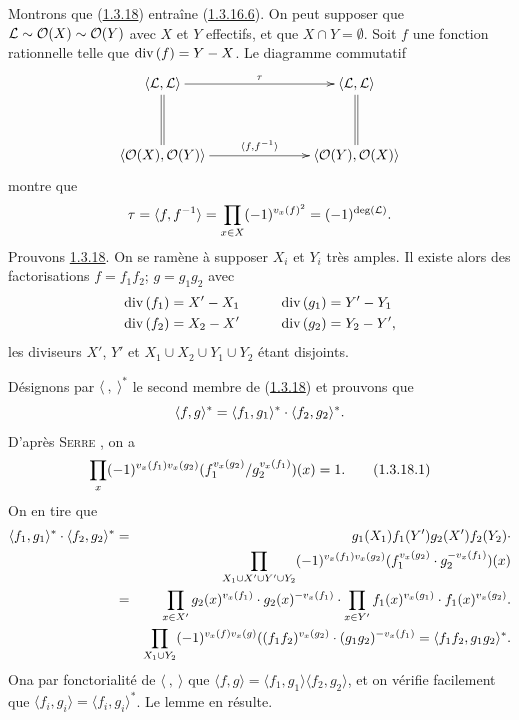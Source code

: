 \documentclass[10pt]{../fichiers-configuration-latex/smfart}
\begin{document}
Montrons que (\hyperref[XVIII.lem1.3.18]{1.3.18}) entraîne
(\hyperref[XVIII.par1.3.16.6]{1.3.16.6}). On peut supposer que 
${\mathcal L}\sim {\mathcal O}(X)\sim {\mathcal O}(Y)$ avec $X$ et $Y$ effectifs, et
que $X\cap Y=∅$. Soit $f$ une fonction rationnelle telle que
$\text{\rm div\,}(f)=Y-X$. Le diagramme commutatif
$$
\xymatrix@C=2.5cm@R=1.25cm{
\langle \Ll, \Ll\rangle  \ar[r]^{\tau} \ar@{=}[d]&
\langle \Ll,\Ll\rangle  \ar@{=}[d]\\
\langle \Oo(X), \Oo(Y)\rangle   \ar[r]^{\langle f,f^{-1}\rangle } & \langle
\Oo(Y), \Oo(X)\rangle 
}
$$
montre que
$$
\tau=\langle f,f^{-1}\rangle =\prod_{x\in
X}(-1)^{v_{x}(f)^{2}}=(-1)^{\deg({\mathcal L})}{}.
$$ Prouvons \hyperref[XVIII.lem1.3.18]{1.3.18}. On se ramène à supposer $X_{i}$ et
$Y_{i}$ très amples. Il existe alors des factorisations $f=f_{1}f_{2}$;
$g=g_{1}g_{2}$ avec
\begin{alignat*}{2}
&\text{\rm div\,}(f_{1}) = X'-X_{1} &\qquad& \text{\rm div\,}(g_{1})
= Y'-Y_{1}\\
& \text{\rm div\,}(f_{2}) = X_{2}-X' &\qquad& \text{\rm div\,}(g_{2})
= Y_{2}-Y'{},
\end{alignat*}
les diviseurs $X'$, $Y'$ et $X_{1}\cup X_{2}\cup Y_{1}\cup Y_{2}$
étant disjoints. 

Désignons par $\langle~,~\rangle^{\ast}$ le second membre de
(\hyperref[XVIII.lem1.3.18]{1.3.18}) et prouvons que 
$$ \langle f,g\rangle ^{\ast}=\langle f_{1},g_{1}\rangle ^{\ast}\cdot
\langle f_{2},g_{2}\rangle ^{\ast}{}.
$$
D'après \textsc{Serre} \cite[Ch.~III, prop.~6, p.~44]{SGA4-18:6}, on a
\begin{equation*}
\prod_{x}(-1)^{v_{x}(f_{1})v_{x}(g_{2})}
(f_{1}^{v_{x}(g_{2})}/g_{2}^{v_{x}(f_{1})}) (x)=1{}.\tag{1.3.18.1}
\end{equation*}%
On en tire que
\begin{eqnarray*}
\langle f_{1},g_{1}\rangle ^{\ast}\cdot \langle f_{2},g_{2}\rangle
^{\ast} &= &g_{1}(X_{1})f_{1}(Y')g_{2}(X')f_{2}(Y_{2})\cdot\\
& & \prod_{X_{1}\cup X'\cup Y'\cup Y_{2}}(-1)^{v_{x}(f_{1})v_{x}(g_{2})}
(f_{1}^{v_{x}(g_{2})}\cdot g_{2}^{-v_{x}(f_{1})})(x)\\
&=&\prod_{x\in X'} g_{2}(x)^{v_{x}(f_{1})}\cdot
g_{2}(x)^{-v_{x}(f_{1})}\cdot \prod_{x\in
Y'}f_{1}(x)^{v_{x}(g_{1})}\cdot f_{1}(x)^{v_{x}(g_{2})}{}.\\
&&\prod_{X_{1}\cup Y_{2}}(-1)^{v_{x}(f)v_{x}(g)}
((f_{1}f_{2})^{v_{x}(g_{2})}\cdot
(g_{1}g_{2})^{-v_{x}(f_{1})}=\langle f_{1}f_{2},g_{1}g_{2}\rangle
^{\ast}{}. 
\end{eqnarray*}
On\pageoriginale a par fonctorialité de $\langle~,~\rangle $ que
$\langle f,g\rangle =\langle f_{1},g_{1}\rangle \langle
f_{2},g_{2}\rangle $, et on vérifie facilement que $\langle
f_{i},g_{i}\rangle =\langle f_{i},g_{i}\rangle ^{\ast}$. Le lemme en
résulte.
\end{document}
